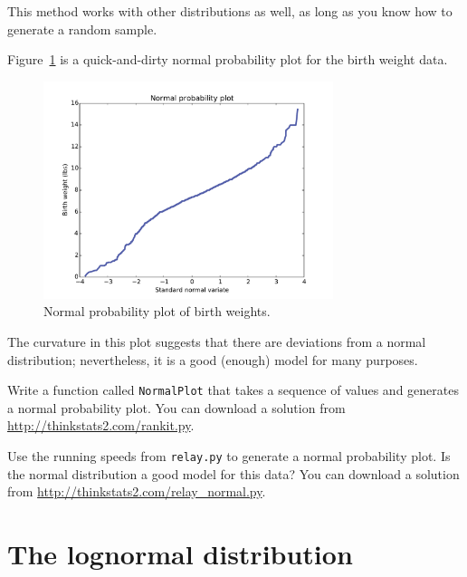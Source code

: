 \documentclass[12pt]{book}
\begin{document}

This method works with other distributions as well, as long as
you know how to generate a random sample.

Figure~\ref{nsfg_birthwgt_normal} is a quick-and-dirty normal
probability plot for the birth weight data.

\begin{figure}
\centerline{\includegraphics[height=2.5in]{figs/nsfg_birthwgt_normal.pdf}}
\caption{Normal probability plot of birth weights.}
\label{nsfg_birthwgt_normal}
\end{figure}

The curvature in this plot suggests that there are
deviations from a normal distribution; nevertheless, it is a
good (enough) model for many purposes.


\begin{exercise}
Write a function called {\tt NormalPlot} that takes a sequence of
values and generates a normal probability plot.  You can download
a solution from \url{http://thinkstats2.com/rankit.py}.

Use the running speeds from {\tt relay.py} to generate a normal
probability plot.  Is the normal distribution a good model for this
data?  You can download a solution from
\url{http://thinkstats2.com/relay_normal.py}.

\end{exercise}


\section{The lognormal distribution}
\label{lognormal}
\end{document}
